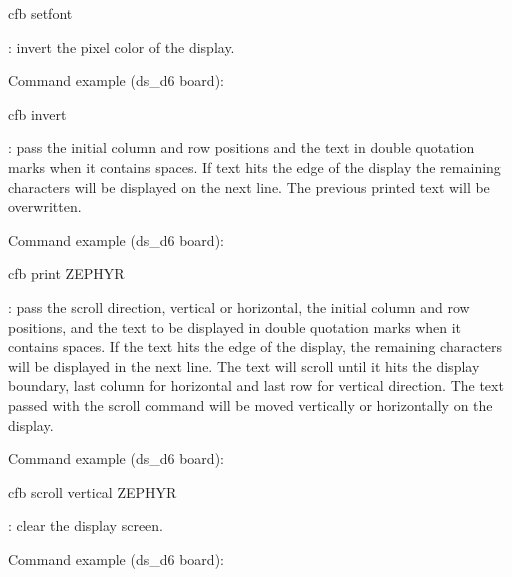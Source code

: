 \documentclass[letterpaper,10pt,english]{sphinxmanual}
\begin{document}
\begin{sphinxVerbatim}[commandchars=\\\{\}]
 cfb set\PYGZus{}font 
\end{sphinxVerbatim}

: invert the pixel color of the display.

Command example (ds\_d6 board):

\begin{sphinxVerbatim}[commandchars=\\\{\}]
 cfb invert
\end{sphinxVerbatim}

: pass the initial column and row positions and the text in
double quotation marks when it contains spaces. If text hits the edge
of the display the remaining characters will be displayed on the next line. The
previous printed text will be overwritten.

Command example (ds\_d6 board):

\begin{sphinxVerbatim}[commandchars=\\\{\}]
 cfb print   ZEPHYR
\end{sphinxVerbatim}

: pass the scroll direction, vertical or horizontal, the initial
column and row positions, and the text to be displayed in double quotation
marks when it contains spaces. If the text hits the edge of the display, the
remaining characters will be displayed in the next line. The text will scroll
until it hits the display boundary, last column for horizontal and last row
for vertical direction. The text passed with the scroll command will be moved
vertically or horizontally on the display.

Command example (ds\_d6 board):

\begin{sphinxVerbatim}[commandchars=\\\{\}]
 cfb scroll vertical   ZEPHYR
\end{sphinxVerbatim}

: clear the display screen.

Command example (ds\_d6 board):
\end{document}
